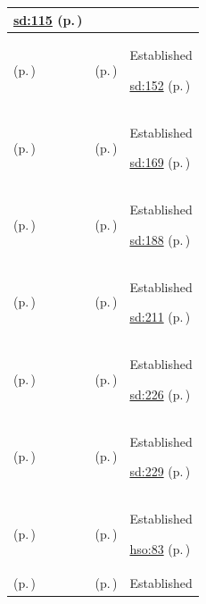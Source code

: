 \begin{longtable}{|>{\raggedright\arraybackslash}p{0.27\TableWidth}|>{\raggedright\arraybackslash}p{0.27\TableWidth}|>{\raggedright\arraybackslash}p{0.46\TableWidth}|}
 \hyperref[rad:sd:110]{sd:115} (p.\,\pageref{rad:sd:110})\\\hline
\nameref{service:longitudinal-medication-history-query} (p.\,\pageref{service:longitudinal-medication-history-query}) & \nameref{feature:feat-sd-11} (p.\,\pageref{feature:feat-sd-11}) & Established

 \hyperref[rad:sd:147]{sd:152} (p.\,\pageref{rad:sd:147})\\\hline
\nameref{service:immunisation-history-query} (p.\,\pageref{service:immunisation-history-query}) & \nameref{feature:feat-sd-13} (p.\,\pageref{feature:feat-sd-13}) & Established

 \hyperref[rad:sd:164]{sd:169} (p.\,\pageref{rad:sd:164})\\\hline
\nameref{service:community-care-encounter-ingress} (p.\,\pageref{service:community-care-encounter-ingress}) & \nameref{feature:feat-sd-15} (p.\,\pageref{feature:feat-sd-15}) & Established

 \hyperref[rad:sd:183]{sd:188} (p.\,\pageref{rad:sd:183})\\\hline
\nameref{service:outreach-batch-reconciliation-service} (p.\,\pageref{service:outreach-batch-reconciliation-service}) & \nameref{feature:feat-sd-18} (p.\,\pageref{feature:feat-sd-18}) & Established

 \hyperref[rad:sd:202]{sd:211} (p.\,\pageref{rad:sd:202})\\\hline
\nameref{service:virtual-encounter-context-resolution} (p.\,\pageref{service:virtual-encounter-context-resolution}) & \nameref{feature:feat-sd-20} (p.\,\pageref{feature:feat-sd-20}) & Established

 \hyperref[rad:sd:221]{sd:226} (p.\,\pageref{rad:sd:221})\\\hline
\nameref{service:remote-telemetry-ingress} (p.\,\pageref{service:remote-telemetry-ingress}) & \nameref{feature:feat-sd-19} (p.\,\pageref{feature:feat-sd-19}) & Established

 \hyperref[rad:sd:221]{sd:229} (p.\,\pageref{rad:sd:221})\\\hline
\nameref{service:clinic-queue-telemetry-service} (p.\,\pageref{service:clinic-queue-telemetry-service}) & \nameref{feature:feat-hso-02} (p.\,\pageref{feature:feat-hso-02}) & Established

 \hyperref[rad:hso:72]{hso:83} (p.\,\pageref{rad:hso:72})\\\hline
\nameref{service:theatre-case-progression-telemetry} (p.\,\pageref{service:theatre-case-progression-telemetry}) & \nameref{feature:feat-hso-05} (p.\,\pageref{feature:feat-hso-05}) & Established


\end{longtable}
